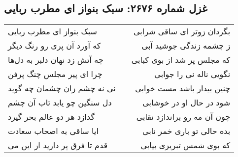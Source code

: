 \begin{center}
\section*{غزل شماره ۲۶۷۶: سبک بنواز ای مطرب ربایی}
\label{sec:2676}
\begin{longtable}{l p{0.5cm} r}
سبک بنواز ای مطرب ربایی
&&
بگردان زوتر ای ساقی شرابی
\\
که آورد آن پری رو رنگ دیگر
&&
ز چشمه زندگی جوشید آبی
\\
چه آتش زد نهان دلبر به دل‌ها
&&
که مجلس پر شد از بوی کبابی
\\
چرا ای پیر مجلس چنگ پرفن
&&
نگویی ناله نی را جوابی
\\
نی نه چشم زان چشمان چه گوید
&&
چنین بیدار باشد مست خوابی
\\
دل سنگین چو یابد تاب آن چشم
&&
شود در حال او در خوشابی
\\
گدازد هر دو عالم بحر گیرد
&&
چون آن مه رو براندازد نقابی
\\
ایا ساقی به اصحاب سعادت
&&
بده حالی تو باری خمر نابی
\\
قدم تا فرق پر دارید از این می
&&
که بوی شمس تبریزی بیابی
\\
\end{longtable}
\end{center}
